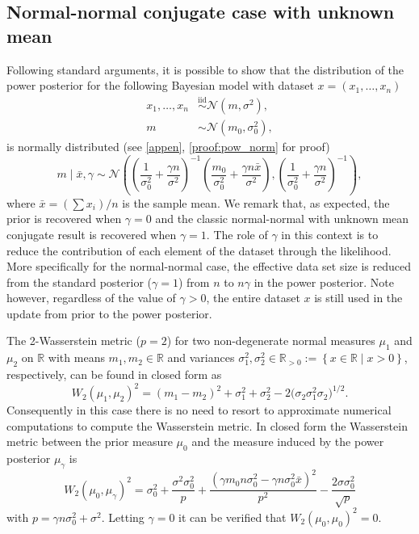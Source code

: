 \documentclass[12pt]{article}
\begin{document}
\subsection{Normal-normal conjugate case with unknown mean}
Following standard arguments, it is possible to show that the distribution of
the power posterior for the following Bayesian model with dataset $x = (x_1,
\ldots, x_n)$
\begin{subequations}
\begin{align}
x_1, \ldots, x_n &\overset{\mathrm{iid}}{\sim} \mathcal{N}(m, \sigma^2), \\
m &\sim \mathcal{N}(m_0, \sigma_0^2),
\end{align}
\end{subequations}
is normally distributed (see \cref{appen}, \cref{proof:pow_norm} for proof)
\begin{equation*}
m \;|\; \bar{x}, \gamma \sim \mathcal{N} \left( \left( \frac{1}{\sigma_0^2} + \frac{\gamma n}{\sigma^2} \right)^{-1} \left(\frac{m_0}{\sigma_0^2} + \frac{\gamma n \bar{x}}{\sigma^2}  \right), \left( \frac{1}{\sigma_0^2} + \frac{\gamma n}{\sigma^2} \right)^{-1} \right),
\end{equation*}
where $\bar{x} = (\sum x_i)/ n$ is the sample mean. We remark that, as
expected, the prior is recovered when $\gamma = 0$ and the classic
normal-normal with unknown mean conjugate result is recovered when $\gamma =
1$. The role of $\gamma$ in this context is to reduce the contribution of each
element of the dataset through the likelihood. More specifically for the
normal-normal case, the effective data set size is reduced from the standard
posterior ($\gamma = 1$) from $n$ to $n \gamma$ in the power posterior. Note
however, regardless of the value of $\gamma > 0$, the entire dataset $x$ is
still used in the update from prior to the power posterior.

The 2-Wasserstein metric ($p = 2$) for two non-degenerate normal
measures $\mu_1$ and $\mu_2$ on $\mathbb{R}$ with means $m_1, m_2 \in
\mathbb{R}$ and variances $\sigma_1^2, \sigma_2^2 \in \mathbb{R}_{>0} :=
\left\lbrace x \in \mathbb{R} \; | \; x > 0 \right\rbrace$, respectively, can
be found in closed form as
\begin{equation*}
W_{2} (\mu_1, \mu_2)^2 = \left( m_1 - m_2 \right)^2 + \sigma_1^2 + \sigma_2^2 - 2 \bigl( \sigma_2 \sigma_1^2 \sigma_2 \bigr)^{1/2}.
\end{equation*}
Consequently in this case there is no need to resort to approximate numerical
computations to compute the Wasserstein metric. In closed form the Wasserstein
metric between the prior measure $\mu_0$ and the measure induced by the power posterior
$\mu_\gamma$ is
\begin{equation*}
W_2(\mu_0, \mu_\gamma)^2 = \sigma_{0}^{2} + \frac{\sigma^{2} \sigma_{0}^{2}}{p} + \frac{\left(\gamma m_{0} n \sigma_{0}^{2} - \gamma n \sigma_{0}^{2} \bar{x}\right)^{2}}{p^{2}} - \frac{2 \sigma \sigma_{0}^{2}}{\sqrt{p}}
\end{equation*}
with $p = \gamma n \sigma_{0}^{2} + \sigma^{2}$.
Letting $\gamma = 0$ it can be verified that $W_2(\mu_0, \mu_0)^2 = 0$. 
\end{document}
